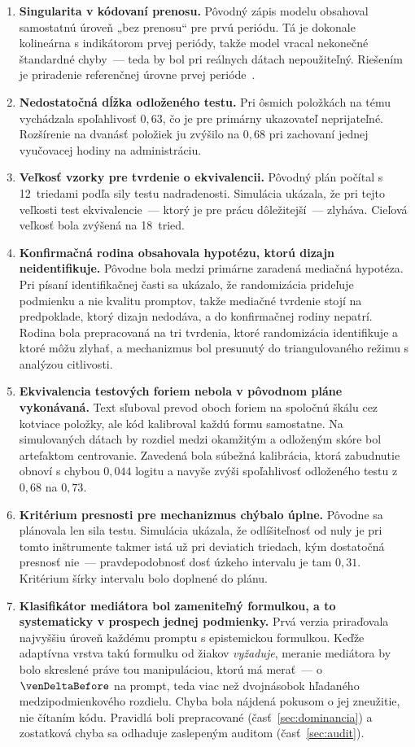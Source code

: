 \begin{enumerate}[nosep]
    \item \textbf{Singularita v kódovaní prenosu.} Pôvodný zápis modelu obsahoval samostatnú úroveň „bez prenosu“ pre prvú periódu. Tá je dokonale kolineárna s indikátorom prvej periódy, takže model vracal nekonečné štandardné chyby~--- teda by bol pri reálnych dátach nepoužiteľný. Riešením je priradenie referenčnej úrovne prvej perióde~\cite{senn2002crossover}.
    \item \textbf{Nedostatočná dĺžka odloženého testu.} Pri ôsmich položkách na tému vychádzala spoľahlivosť $0{,}63$, čo je pre primárny ukazovateľ neprijateľné. Rozšírenie na dvanásť položiek ju zvýšilo na $0{,}68$ pri zachovaní jednej vyučovacej hodiny na administráciu.
    \item \textbf{Veľkosť vzorky pre tvrdenie o ekvivalencii.} Pôvodný plán počítal s 12~triedami podľa sily testu nadradenosti. Simulácia ukázala, že pri tejto veľkosti test ekvivalencie~--- ktorý je pre prácu dôležitejší~--- zlyháva. Cieľová veľkosť bola zvýšená na 18~tried.
    \item \textbf{Konfirmačná rodina obsahovala hypotézu, ktorú dizajn neidentifikuje.} Pôvodne bola medzi primárne zaradená mediačná hypotéza. Pri písaní identifikačnej časti sa ukázalo, že randomizácia prideľuje podmienku a nie kvalitu promptov, takže mediačné tvrdenie stojí na predpoklade, ktorý dizajn nedodáva, a do konfirmačnej rodiny nepatrí. Rodina bola prepracovaná na tri tvrdenia, ktoré randomizácia identifikuje a ktoré môžu zlyhať, a mechanizmus bol presunutý do triangulovaného režimu s analýzou citlivosti.
    \item \textbf{Ekvivalencia testových foriem nebola v pôvodnom pláne vykonávaná.} Text sľuboval prevod oboch foriem na spoločnú škálu cez kotviace položky, ale kód kalibroval každú formu samostatne. Na simulovaných dátach by rozdiel medzi okamžitým a odloženým skóre bol artefaktom centrovanie. Zavedená bola súbežná kalibrácia, ktorá zabudnutie obnoví s chybou $0{,}044$ logitu a navyše zvýši spoľahlivosť odloženého testu z $0{,}68$ na $0{,}73$.
    \item \textbf{Kritérium presnosti pre mechanizmus chýbalo úplne.} Pôvodne sa plánovala len sila testu. Simulácia ukázala, že odlíšiteľnosť od nuly je pri tomto inštrumente takmer istá už pri deviatich triedach, kým dostatočná presnosť nie~--- pravdepodobnosť dosť úzkeho intervalu je tam $0{,}31$. Kritérium šírky intervalu bolo doplnené do plánu.
    \item \textbf{Klasifikátor mediátora bol zameniteľný formulkou, a to systematicky v prospech jednej podmienky.} Prvá verzia priraďovala najvyššiu úroveň každému promptu s epistemickou formulkou. Keďže adaptívna vrstva takú formulku od žiakov \emph{vyžaduje}, meranie mediátora by bolo skreslené práve tou manipuláciou, ktorú má merať~--- o $\venDeltaBefore$ na prompt, teda viac než dvojnásobok hľadaného medzipodmienkového rozdielu. Chyba bola nájdená pokusom o jej zneužitie, nie čítaním kódu. Pravidlá boli prepracované (časť~\ref{sec:dominancia}) a zostatková chyba sa odhaduje zaslepeným auditom (časť~\ref{sec:audit}).

\end{enumerate}
